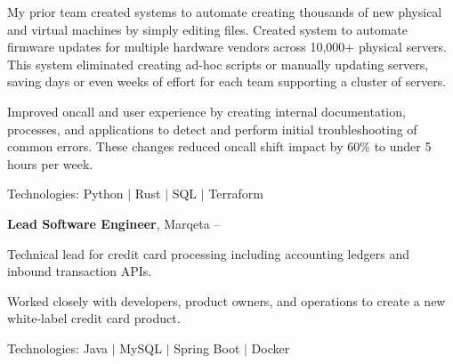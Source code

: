\documentclass[MMMMyyyy,nonstopmode]{simpleresumecv_stacked}
\newcommand{\tech}[1]{\Gap\textrm{Technologies:} #1}
\newif\ifLOCATION
\begin{document}
\begin{Body}
\begin{Detail}
\Gap
My prior team created systems to automate creating thousands of new physical and virtual machines by simply editing files. 
\BulletItem
Created system to automate firmware updates for multiple hardware vendors across 10,000+ physical servers. 
This system eliminated creating ad-hoc scripts or manually updating servers, saving days or even weeks of effort for each team supporting a cluster of servers.

\BulletItem
Improved oncall and user experience by creating internal documentation, processes, and applications to detect and perform initial troubleshooting of common errors.
These changes reduced oncall shift impact by 60\% to under 5 hours per week.


\fi 		%

\tech{Python $|$ Rust $|$ SQL $|$ Terraform}

\end{Detail}

\BigGap

\Entry
\textbf{Lead Software Engineer}, Marqeta
\hfill
 -- 

\ifLOCATION
\hfill
Rochester, New York
\fi
\Gap
\begin{Detail}
Technical lead for credit card processing including accounting ledgers and inbound transaction APIs.

\Gap

\BulletItem
Worked closely with developers, product owners, and operations to create a new white-label credit card product. 

\tech{Java $|$ MySQL $|$ Spring Boot $|$ Docker}

\end{Detail}


\end{Body}
\end{document}
